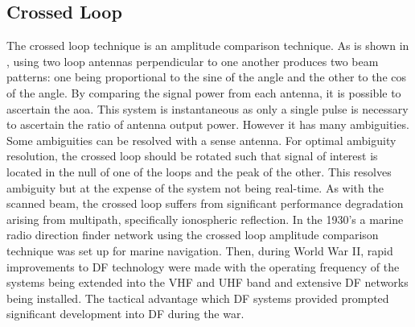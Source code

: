\subsection{Crossed Loop}
The crossed loop technique is an amplitude comparison technique. 
As is shown in , using two loop antennas perpendicular to one another produces two beam patterns: one being proportional to the sine of the angle and the other to the cos of the angle. 
By comparing the signal power from each antenna, it is possible to ascertain the \gls{aoa}. This system is instantaneous as only a single pulse is necessary to ascertain the ratio of antenna output power. However it has many ambiguities. Some ambiguities can be resolved with a sense antenna. 
For optimal ambiguity resolution, the crossed loop should be rotated such that signal of interest is located in the null of one of the loops and the peak of the other. This resolves ambiguity but at the expense of the system not being real-time.
As with the scanned beam, the crossed loop suffers from significant performance degradation arising from multipath, specifically ionospheric reflection. 
In the 1930's a marine radio direction finder network using the crossed loop amplitude comparison technique was set up for marine navigation. Then, during World War II, rapid improvements to DF technology were made with the operating frequency of the systems being extended into the VHF and UHF band  and extensive DF networks being installed\cite{jenkins1991smallaperture}. The tactical advantage which DF systems provided prompted significant development into DF during the war.
